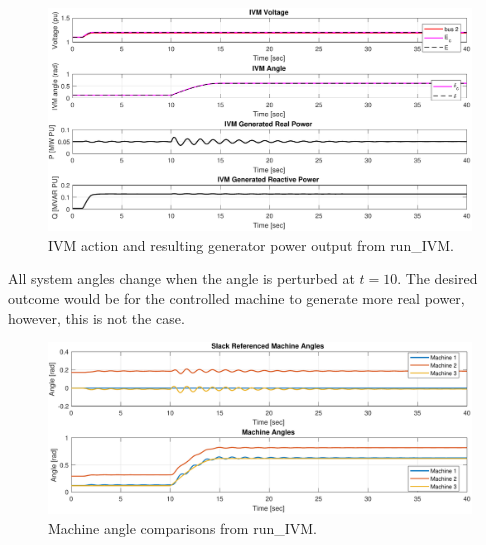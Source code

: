 \begin{figure}[H]
	\centering
	\footnotesize
	\includegraphics[width=\linewidth]{examples/ivmmod/ivm-vdelta}
	\caption{IVM action and resulting generator power output from run\_IVM.}
	\label{fig: ivm pw}
\end{figure}%
\pagebreak
All system angles change when the angle is perturbed at $t=10$.
The desired outcome would be for the controlled machine to generate more real power, however, this is not the case.
\begin{figure}[H]
	\centering
	\footnotesize
	\includegraphics[width=\linewidth]{examples/ivmmod/ivm-angle}
	\caption{Machine angle comparisons from run\_IVM.}
	\label{fig: ivm angle}
\end{figure}%
